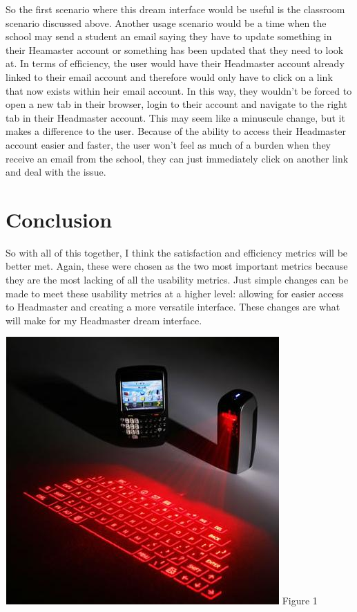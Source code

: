 \documentclass{article}
\begin{document}
So the first scenario where this dream interface would be useful is the classroom scenario discussed above. Another usage scenario would be a time when the school may send a student an email saying they have to update something in their Heamaster account or something has been updated that they need to look at. In terms of efficiency, the user would have their Headmaster account already linked to their email account and therefore would only have to click on a link that now exists within heir email account. In this way, they wouldn't be forced to open a new tab in their browser, login to their account and navigate to the right tab in their Headmaster account. This may seem like a minuscule change, but it makes a difference to the user. Because of the ability to access their Headmaster account easier and faster, the user won't feel as much of a burden when they receive an email from the school, they can just immediately click on another link and deal with the issue.

\section{Conclusion}
	So with all of this together, I think the satisfaction and efficiency metrics will be better met. Again, these were chosen as the two most important metrics because they are the most lacking of all the usability metrics. Just simple changes can be made to meet these usability metrics at a higher level: allowing for easier access to Headmaster and creating a more versatile interface. These changes are what will make for my Headmaster dream interface.

\pagebreak



\pagebreak

\includegraphics{celluonKeyboard.jpg}
Figure 1
\cite{image}
\end{document}
